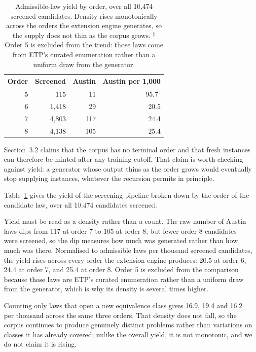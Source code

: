 \documentclass[letterpaper]{article}
\begin{document}
\begin{table}[t]
\centering
\begin{tabular}{@{}rrrr@{}}
\toprule
Order & Screened & Austin & Austin per 1{,}000 \\
\midrule
5 & 115   & 11  & 95.7$^{\ddagger}$ \\
6 & 1,418 & 29  & 20.5 \\
7 & 4,803 & 117 & 24.4 \\
8 & 4,138 & 105 & 25.4 \\
\bottomrule
\end{tabular}
\caption{Admissible-law yield by order, over all 10,474 screened candidates.
Density rises monotonically across the orders the extension engine generates,
so the supply does not thin as the corpus grows. $^{\ddagger}$Order 5 is
excluded from the trend: those laws come from ETP's curated enumeration rather
than a uniform draw from the generator.}
\label{tab:renewability}
\end{table}

Section~3.2 claims that the corpus has no terminal order and that fresh
instances can therefore be minted after any training cutoff. That claim is
worth checking against yield: a generator whose output thins as the order
grows would eventually stop supplying instances, whatever the recursion
permits in principle.

Table~\ref{tab:renewability} gives the yield of the screening pipeline broken
down by the order of the candidate law, over all 10,474 candidates screened.

Yield must be read as a density rather than a count. The raw number of Austin
laws dips from 117 at order 7 to 105 at order 8, but fewer order-8 candidates
were screened, so the dip measures how much was generated rather than how much
was there. Normalised to admissible laws per thousand screened candidates, the
yield rises across every order the extension engine produces: 20.5 at order 6,
24.4 at order 7, and 25.4 at order 8. Order 5 is excluded from the comparison
because those laws are ETP's curated enumeration rather than a uniform draw
from the generator, which is why its density is several times higher.

Counting only laws that open a new equivalence class gives 16.9, 19.4 and 16.2
per thousand across the same three orders. That density does not fall, so the
corpus continues to produce genuinely distinct problems rather than variations
on classes it has already covered; unlike the overall yield, it is not
monotonic, and we do not claim it is rising.
\end{document}

